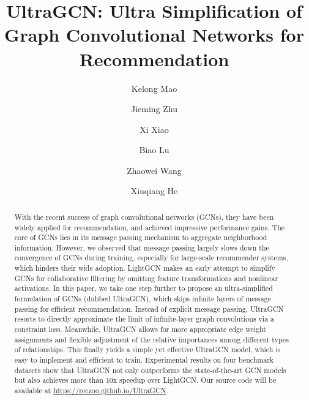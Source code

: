 \documentclass[sigconf,authorversion]{acmart}
\begin{document}
\fancyhead{}
\title{UltraGCN: Ultra Simplification of Graph Convolutional Networks for Recommendation}



\author{Kelong Mao}

\author{Jieming Zhu}

\author{Xi Xiao}

\author{Biao Lu}

\author{Zhaowei Wang}

\author{Xiuqiang He}
















\begin{abstract}
    With the recent success of graph convolutional networks (GCNs), they have been widely applied for recommendation, and achieved impressive performance gains. The core of GCNs lies in its message passing mechanism to aggregate neighborhood information. However, we observed that message passing largely slows down the convergence of GCNs during training, especially for large-scale recommender systems, which hinders their wide adoption. LightGCN makes an early attempt to simplify GCNs for collaborative filtering by omitting feature transformations and nonlinear activations. In this paper, we take one step further to propose an ultra-simplified formulation of GCNs (dubbed UltraGCN), which skips infinite layers of message passing for efficient recommendation.  
    Instead of explicit message passing, UltraGCN resorts to directly approximate the limit of infinite-layer graph convolutions via a constraint loss. Meanwhile, UltraGCN allows for more appropriate edge weight assignments and flexible adjustment of the relative importances among different types of relationships. This finally yields a simple yet effective UltraGCN model, which is easy to implement and efficient to train. Experimental results on four benchmark datasets show that UltraGCN not only outperforms the state-of-the-art GCN models but also achieves more than 10x speedup over LightGCN. Our source code will be available at \textcolor{magenta}{\url{https://reczoo.github.io/UltraGCN}}.
\end{abstract}
\end{document}
